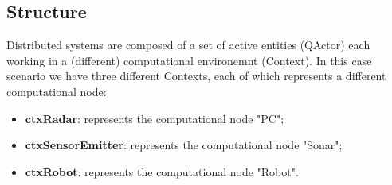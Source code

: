 \subsection{Structure}
Distributed systems are composed of a set of active entities (QActor) each working in a (different) computational environemnt (Context). In this case scenario we have three different Contexts, each of which represents a different computational node:
\begin{itemize}
	\item \textbf{ctxRadar}: represents the computational node "PC";
	\item \textbf{ctxSensorEmitter}: represents the computational node "Sonar";
	\item \textbf{ctxRobot}: represents the computational node "Robot".
\end{itemize}